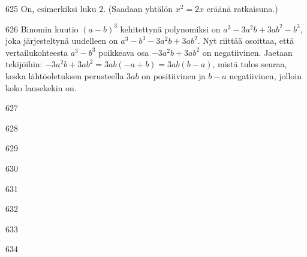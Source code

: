 \begin{Vastaus}{625}
On, esimerkiksi luku $2$. (Saadaan yhtälön $x^2=2x$ eräänä ratkaisuna.)
	
\end{Vastaus}
\begin{Vastaus}{626}
	Binomin kuutio $(a-b)^3$ kehitettynä polynomiksi on $a^3-3a^2b+3ab^2-b^3$, joka järjesteltynä uudelleen on $a^3-b^3-3a^2b+3ab^2$. Nyt riittää osoittaa, että vertailukohteesta $a^3-b^3$ poikkeava osa $-3a^2b+3ab^2$ on negatiivinen. Jaetaan tekijöihin: $-3a^2b+3ab^2=3ab(-a+b)=3ab(b-a)$, mistä tulos seuraa, koska lähtöoletuksen perusteella $3ab$ on positiivinen ja $b-a$ negatiivinen, jolloin koko lausekekin on.
	
\end{Vastaus}
\begin{Vastaus}{627}
    
\end{Vastaus}
\begin{Vastaus}{628}
    
\end{Vastaus}
\begin{Vastaus}{629}
    
\end{Vastaus}
\begin{Vastaus}{630}
    
\end{Vastaus}
\begin{Vastaus}{631}
    
\end{Vastaus}
\begin{Vastaus}{632}
	
\end{Vastaus}
\begin{Vastaus}{633}
    
\end{Vastaus}
\begin{Vastaus}{634}
	
\end{Vastaus}
